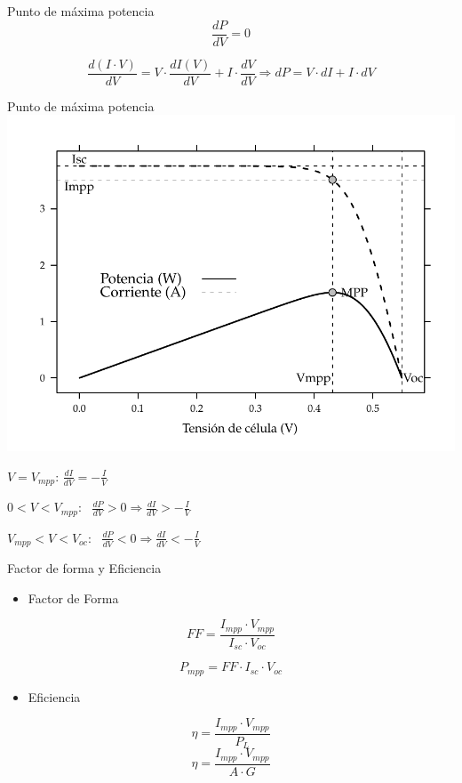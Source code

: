 \documentclass[xcolor={usenames,svgnames,dvipsnames}]{beamer}
\begin{document}
\begin{frame}[label=sec-3-1-3]{Punto de máxima potencia}
$$\frac{dP}{dV}=0$$

$$\frac{d(I\cdot
  V)}{dV}=V\cdot\frac{dI(V)}{dV}+I\cdot\frac{dV}{dV}\Rightarrow
dP=V\cdot dI+I\cdot dV$$
\end{frame}



\begin{frame}[label=sec-3-1-4]{Punto de máxima potencia}
\includegraphics[width=.9\linewidth]{../figs/CurvaIV_Ta20_G800.pdf}

$V=V_{mpp}:\,\frac{dI}{dV}=-\frac{I}{V}$

$0<V<V_{mpp}$:  $\frac{dP}{dV}>0\Rightarrow\frac{dI}{dV}>-\frac{I}{V}$

$V_{mpp}<V<V_{oc}$: 
$\frac{dP}{dV}<0\Rightarrow\frac{dI}{dV}<-\frac{I}{V}$
\end{frame}

\begin{frame}[label=sec-3-1-5]{Factor de forma y Eficiencia}
\begin{itemize}
\item Factor de Forma
\end{itemize}
$$FF=\frac{I_{mpp}\cdot V_{mpp}}{I_{sc}\cdot V_{oc}}$$

$$P_{mpp}=FF\cdot I_{sc}\cdot V_{oc}$$

\begin{itemize}
\item Eficiencia
\end{itemize}

$$\eta = \frac{I_{mpp}\cdot V_{mpp}}{P_{L}}$$
$$\eta = \frac{I_{mpp}\cdot V_{mpp}}{A \cdot G}$$
\end{frame}
\end{document}
